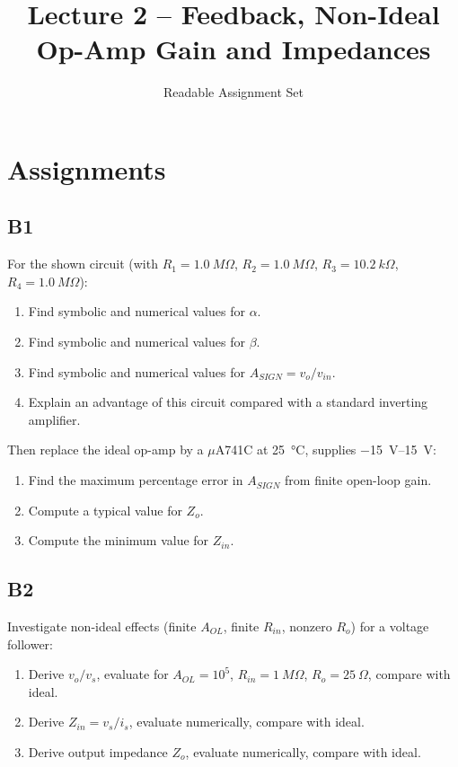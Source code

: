 \documentclass[12pt,a4paper]{article}
\title{Lecture 2 -- Feedback, Non-Ideal Op-Amp Gain and Impedances}
\author{Readable Assignment Set}
\date{}
\begin{document}
\maketitle
\tableofcontents

\section{Assignments}
\subsection{B1}
For the shown circuit (with $R_1=\SI{1.0}{M\Omega}$, $R_2=\SI{1.0}{M\Omega}$, $R_3=\SI{10.2}{k\Omega}$, $R_4=\SI{1.0}{M\Omega}$):
\begin{enumerate}
\item Find symbolic and numerical values for $\alpha$.
\item Find symbolic and numerical values for $\beta$.
\item Find symbolic and numerical values for $A_{SIGN}=v_o/v_{in}$.
\item Explain an advantage of this circuit compared with a standard inverting amplifier.
\end{enumerate}
Then replace the ideal op-amp by a \(\mu\)A741C at \SI{25}{\celsius}, supplies \SIrange{-15}{15}{V}:
\begin{enumerate}[resume]
\item Find the maximum percentage error in $A_{SIGN}$ from finite open-loop gain.
\item Compute a typical value for $Z_o$.
\item Compute the minimum value for $Z_{in}$.
\end{enumerate}

\subsection{B2}
Investigate non-ideal effects (finite $A_{OL}$, finite $R_{in}$, nonzero $R_o$) for a voltage follower:
\begin{enumerate}[label=\alph*)]
\item Derive $v_o/v_s$, evaluate for $A_{OL}=10^5$, $R_{in}=\SI{1}{M\Omega}$, $R_o=\SI{25}{\Omega}$, compare with ideal.
\item Derive $Z_{in}=v_s/i_s$, evaluate numerically, compare with ideal.
\item Derive output impedance $Z_o$, evaluate numerically, compare with ideal.
\end{enumerate}
\end{document}
